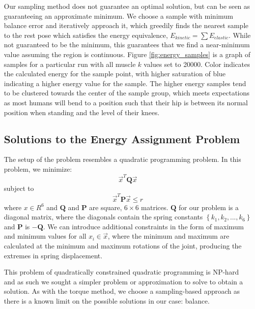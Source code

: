 Our sampling method does not guarantee an optimal solution, but can be seen as guaranteeing an approximate minimum.  We choose a sample with minimum balance error and iteratively approach it, which greedily finds the nearest sample to the rest pose which satisfies the energy equivalence, $E_{kinetic} = \displaystyle\sum E_{elastic}$.  While not guaranteed to be the minimum, this guarantees that we find a near-minimum value assuming the region is continuous.  Figure \ref{fig:energy_samples} is a graph of samples for a particular run with all muscle $k$ values set to 20000.  Color indicates the calculated energy for the sample point, with higher saturation of blue indicating a higher energy value for the sample.  The higher energy samples tend to be clustered towards the center of the sample group, which meets expectations as most humans will bend to a position such that their hip is between its normal position when standing and the level of their knees.


\subsection{Solutions to the Energy Assignment Problem}
\label{subsection:energy_prob}
The setup of the problem resembles a quadratic programming problem.  In this problem, we minimize: \[ \vec{x}^T \mathbf{Q} \vec{x} \] subject to
\[ \vec{x}^T \mathbf{P} \vec{x} \le r \] where $x \in R^6$ and $\mathbf{Q}$ and $\mathbf{P}$ are square, $6 \times 6$ matrices.  $\mathbf{Q}$ for our problem is a diagonal matrix, where the diagonals contain the spring constants $\left\lbrace k_1, k_2, ... , k_6 \right\rbrace$ and $\mathbf{P}$ is $- \mathbf{Q}$.  We can introduce additional constraints in the form of maximum and minimum values for all $x_i \in \vec{x}$, where the minimum and maximum are calculated at the minimum and maximum rotations of the joint, producing the extremes in spring displacement.

This problem of quadratically constrained quadratic programming is NP-hard and as such we sought a simpler problem or approximation to solve to obtain a solution.  As with the torque method, we choose a sampling-based approach as there is a known limit on the possible solutions in our case: balance.  

